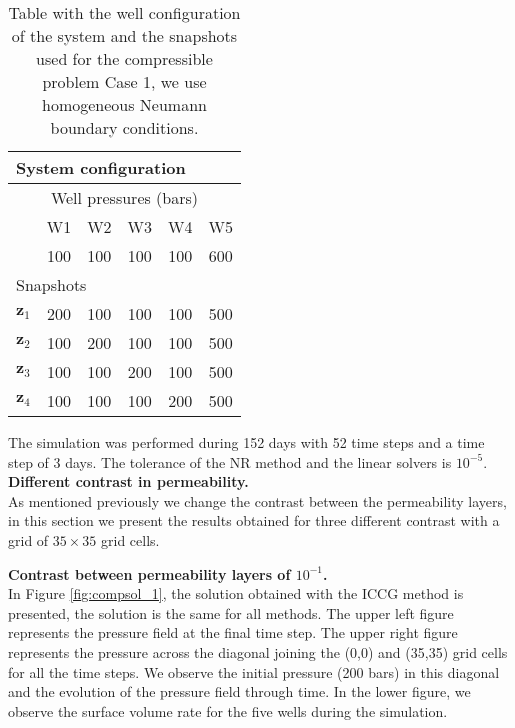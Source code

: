 \documentclass[12pt]{article}
\numberwithin{equation}{section}
\begin{document}
 \renewcommand{\arraystretch}{1.3}
\begin{table}[!ht]\centering
\begin{minipage}{.7\textwidth}
\vspace{-10pt}
\centering
\begin{tabular}{ |c|c|c|c|c|c|} 
 \hline
  \multicolumn{6}{|l|}{System configuration} \\ 
  \hline
  \multicolumn{6}{|c|}{Well pressures (bars)}\\
  \hline
  &W1 &W2 &W3 &W4 &W5 \\
  \hline
&100 & 100& 100& 100& 600\\
\hline
\multicolumn{6}{|l|}{Snapshots } \\
  \hline
$\mathbf{z}_1$&200 & 100& 100& 100& 500\\
$\mathbf{z}_2$&100 & 200& 100& 100& 500\\
$\mathbf{z}_3$&100 & 100& 200& 100& 500\\
$\mathbf{z}_4$&100 & 100& 100& 200& 500\\
 \hline
 \end{tabular}
\caption{Table with the well configuration of the system and the snapshots used for the compressible problem Case 1, we use homogeneous Neumann boundary conditions.}\label{table:ccase1}
\end{minipage}
\end{table}
 
The simulation was performed during 152 days with 52 time steps and a time step of 3 days. The tolerance of the NR method and the linear solvers is $10^{-5}$.\\
\newpage
\textbf{Different contrast in permeability.}\\
As mentioned previously we change the contrast between the permeability layers, in this section we present the results obtained for three different contrast with a grid of $35 \times 35$ grid cells.

\textbf{Contrast between permeability layers of $10^{-1}$.}\\
In Figure \ref{fig:compsol_1}, the solution obtained with the ICCG method is presented, the solution is the same for all methods. The upper left figure represents the pressure field at the final time step. The upper right figure represents the pressure across the diagonal joining the (0,0) and (35,35) grid cells for all the time steps. We observe the initial pressure (200 bars) in this diagonal and the evolution of the pressure field through time. In the lower figure, we observe the surface volume rate for the five wells during the simulation.
\end{document}
